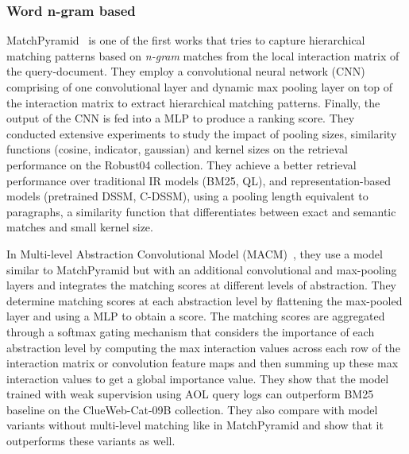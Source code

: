 \subsubsection{Word n-gram based}
\textsf{MatchPyramid}~\citep{matchpyramid16} is one of the first works that tries to capture hierarchical matching patterns based on \textit{n-gram} matches from the local interaction matrix of the query-document. They employ a convolutional neural network (CNN) comprising of one convolutional layer and dynamic max pooling layer on top of the interaction matrix to extract hierarchical matching patterns. Finally, the output of the CNN is fed into a MLP to produce a ranking score. They conducted extensive experiments to study the impact of pooling sizes, similarity functions (cosine, indicator, gaussian) and kernel sizes on the retrieval performance on the Robust04 collection. They achieve a better retrieval performance over traditional IR models (BM25, QL), and representation-based models (pretrained DSSM, C-DSSM), using a pooling length equivalent to paragraphs, a similarity function that differentiates between exact and semantic matches and small kernel size. 

In \textsf{Multi-level Abstraction Convolutional Model} (MACM)~\citep{Nie_ictir18, Nie_sigir_2018}, they use a model similar to MatchPyramid but with an additional convolutional and max-pooling layers and integrates the matching scores at different levels of abstraction. They determine matching scores at each abstraction level by flattening the max-pooled layer and using a MLP to obtain a score. The matching scores are aggregated through a softmax gating mechanism that considers the importance of each abstraction level by computing the max interaction values across each row of the interaction matrix or convolution feature maps and then summing up these max interaction values to get a global importance value. They show that the model trained with weak supervision using AOL query logs can outperform BM25 baseline on the ClueWeb-Cat-09B collection. They also compare with model variants without multi-level matching like in MatchPyramid and show that it outperforms these variants as well.

